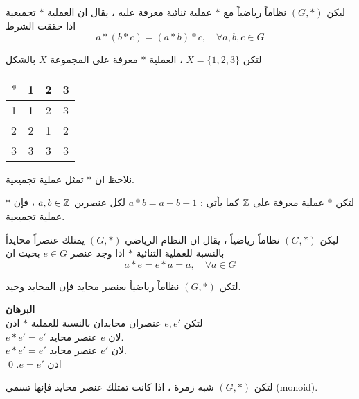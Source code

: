 \begin{definition}
	ليكن $(G, *)$ نظاماً رياضياً مع $*$ عملية ثنائية معرفة عليه ، يقال ان العملية $*$ تجميعية اذا حققت الشرط
	\[
	a*(b*c) = (a*b)*c,\quad \forall a,b,c\in G
	\]
\end{definition}

\begin{example}
	لتكن $X = \{1,2,3\}$ ، العملية $*$ معرفة على المجموعة $X$ بالشكل
	\begin{table}[H]
		\renewcommand{\arraystretch}{1.4}
		\centering
		\setLR
		\begin{tabular}{|c|c|c|c|}
			\hline
			$*$ & 1&2&3\\
			\hline
			1&1&2&3\\
			\hline
			2&2&1&2\\
			\hline
			3&3&3&3\\
			\hline
		\end{tabular}
	\end{table}
	\setRL\noindent
	نلاحظ ان $*$ تمثل عملية تجميعية.
\end{example}

\begin{example}
	لتكن $*$ عملية معرفة على $\mathbb{Z}$ كما يأتي : $a*b =a+b-1$ لكل عنصرين $a, b\in \mathbb{Z}$ ، فإن $*$ عملية تجميعية.
\end{example}

\begin{definition}
	ليكن $(G, *)$ نظاماً رياضياً ، يقال ان النظام الرياضي $(G, *)$ يمتلك عنصراً محايداً بالنسبة للعملية الثنائية $*$ اذا وجد عنصر $e \in G$ بحيث ان
	\[
	a * e = e*a = a,\quad \forall a\in G
	\]
\end{definition}

\begin{theorem}
	لتكن $(G, *)$ نظاماً رياضياً بعنصر محايد فإن المحايد وحيد.
\end{theorem}
\noindent
\textbf{البرهان}\\
\noindent
لتكن $e, e'$ عنصران محايدان بالنسبة للعملية $*$ اذن\\
$e*e' =e'$ لان $e$ عنصر محايد.\\
$e*e' =e'$ لان $e'$ عنصر محايد.\\
اذن $e=e'$. \qed

\begin{definition}[(monoid)]
	لتكن $(G, *)$ شبه زمرة ، اذا كانت تمتلك عنصر محايد فإنها تسمى (monoid).
\end{definition}

